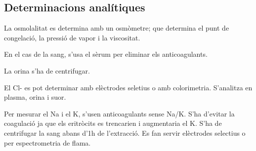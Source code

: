 \subsection{Determinacions analítiques}
\label{sec:determ-anal}

La osmolalitat es determina amb un osmòmetre; que determina el punt de
congelació, la pressió de vapor i la viscositat.

En el cas de la sang, s'usa el sèrum per eliminar els anticoagulants.

La orina s'ha de centrifugar.


El Cl- es pot determinar amb elèctrodes seletius o amb
colorimetria. S'analitza en plasma, orina i suor.

Per mesurar el Na i el K, s'usen anticoagulants sense Na/K. S'ha
d'evitar la coagulació ja que els eritròcits es trencarien i
augmentaria el K. S'ha de centrifugar la sang abans d'1h de
l'extracció. Es fan servir elèctrodes selectius o per espectrometria
de flama.


